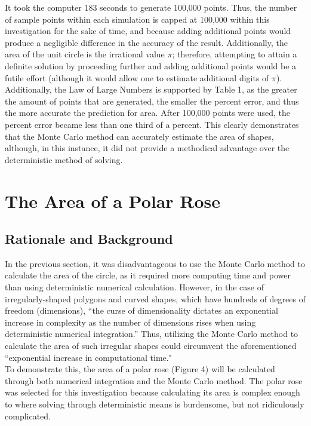 \documentclass[11pt]{article}
\begin{document}
It took the computer 183 seconds to generate 100,000 points. Thus, the number of sample points within each simulation is capped at 100,000 within this investigation for the sake of time, and because adding additional points would produce a negligible difference in the accuracy of the result. Additionally, the area of the unit circle is the irrational value $\pi$; therefore, attempting to attain a definite solution by proceeding further and adding additional points would be a futile effort (although it would allow one to estimate additional digits of $\pi$).\\[3ex]

Additionally, the Law of Large Numbers is supported by Table 1, as the greater the amount of points that are generated, the smaller the percent error, and thus the more accurate the prediction for area. After 100,000 points were used, the percent error became less than one third of a percent.  This clearly demonstrates that the Monte Carlo method can accurately estimate the area of shapes, although, in this instance, it did not provide a methodical advantage over the deterministic method of solving.\\


\section{The Area of a Polar Rose}
\subsection{Rationale and Background}

In the previous section, it was disadvantageous to use the Monte Carlo method to calculate the area of the circle, as it required more computing time and power than using deterministic numerical calculation. However, in the case of irregularly-shaped polygons and curved shapes, which have hundreds of degrees of freedom (dimensions), ``the curse of dimensionality dictates an exponential increase in complexity as the number of dimensions rises when using deterministic numerical integration.”\cite{dynamicprogramming} Thus, utilizing the Monte Carlo method to calculate the area of such irregular shapes could circumvent the aforementioned ``exponential increase in computational time." \\[3ex]

To demonstrate this, the area of a polar rose (Figure 4) will be calculated through both numerical integration and the Monte Carlo method. The polar rose was selected for this investigation because calculating its area is complex enough to where solving through deterministic means is burdensome, but not ridiculously complicated. 
\end{document}
